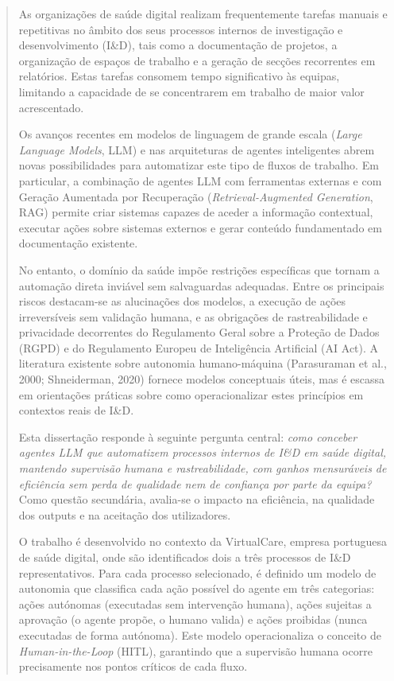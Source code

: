\begin{abstract}

As organizações de saúde digital realizam frequentemente tarefas manuais e repetitivas no âmbito dos seus processos internos de investigação e desenvolvimento (I\&D), tais como a documentação de projetos, a organização de espaços de trabalho e a geração de secções recorrentes em relatórios. Estas tarefas consomem tempo significativo às equipas, limitando a capacidade de se concentrarem em trabalho de maior valor acrescentado.

Os avanços recentes em modelos de linguagem de grande escala (\textit{Large Language Models}, LLM) e nas arquiteturas de agentes inteligentes abrem novas possibilidades para automatizar este tipo de fluxos de trabalho. Em particular, a combinação de agentes LLM com ferramentas externas e com Geração Aumentada por Recuperação (\textit{Retrieval-Augmented Generation}, RAG) permite criar sistemas capazes de aceder a informação contextual, executar ações sobre sistemas externos e gerar conteúdo fundamentado em documentação existente.

No entanto, o domínio da saúde impõe restrições específicas que tornam a automação direta inviável sem salvaguardas adequadas. Entre os principais riscos destacam-se as alucinações dos modelos, a execução de ações irreversíveis sem validação humana, e as obrigações de rastreabilidade e privacidade decorrentes do Regulamento Geral sobre a Proteção de Dados (RGPD) e do Regulamento Europeu de Inteligência Artificial (AI Act). A literatura existente sobre autonomia humano-máquina (Parasuraman et al., 2000; Shneiderman, 2020) fornece modelos conceptuais úteis, mas é escassa em orientações práticas sobre como operacionalizar estes princípios em contextos reais de I\&D.

Esta dissertação responde à seguinte pergunta central: \textit{como conceber agentes LLM que automatizem processos internos de I\&D em saúde digital, mantendo supervisão humana e rastreabilidade, com ganhos mensuráveis de eficiência sem perda de qualidade nem de confiança por parte da equipa?} Como questão secundária, avalia-se o impacto na eficiência, na qualidade dos outputs e na aceitação dos utilizadores.

O trabalho é desenvolvido no contexto da VirtualCare, empresa portuguesa de saúde digital, onde são identificados dois a três processos de I\&D representativos. Para cada processo selecionado, é definido um modelo de autonomia que classifica cada ação possível do agente em três categorias: ações autónomas (executadas sem intervenção humana), ações sujeitas a aprovação (o agente propõe, o humano valida) e ações proibidas (nunca executadas de forma autónoma). Este modelo operacionaliza o conceito de \textit{Human-in-the-Loop} (HITL), garantindo que a supervisão humana ocorre precisamente nos pontos críticos de cada fluxo.


\end{abstract}
